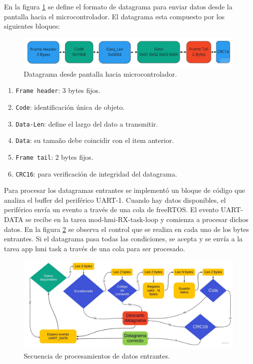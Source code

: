 En la figura \ref{fig:datagrama_a} se define el formato de datagrama para enviar datos desde la pantalla hacia el microcontrolador. El datagrama esta compuesto por los siguientes bloques:

\begin{figure}[h!]
	\centering
	\includegraphics[width=1\textwidth]{./Figures/datagrama_a.jpg}
	\caption{Datagrama desde pantalla hacia microcontrolador.}
	\label{fig:datagrama_a}
\end{figure}

\begin{enumerate}

\item \texttt{Frame header}: 3 bytes fijos.
\item \texttt{Code}: identificación única de objeto.
\item \texttt{Data-Len}: define el largo del dato a transmitir.
\item \texttt{Data}: su tamaño debe coincidir con el item anterior.
\item \texttt{Frame tail}: 2 bytes fijos.
\item \texttt{CRC16}: para verificación de integridad del datagrama.

\end{enumerate}

Para procesar los datagramas entrantes se implementó un bloque de código que analiza el buffer del periférico UART-1. Cuando hay datos disponibles, el periférico envía un evento a través de una cola de freeRTOS. El evento UART-DATA se recibe en la tarea mod-hmi-RX-task-loop y comienza a procesar dichos datos. En la figura \ref{fig:secuencia_a} se observa el control que se realiza en cada uno de los bytes entrantes. Si el datagrama pasa todas las condiciones, se acepta y se envía a la tarea app hmi task a través de una cola para ser procesado.

\begin{figure}[h!]
	\centering
	\includegraphics[width=1\textwidth]{./Figures/Secuencia_lectura_uart_a.jpg}
	\caption{Secuencia de procesamientos de datos entrantes.}
	\label{fig:secuencia_a}
\end{figure}

